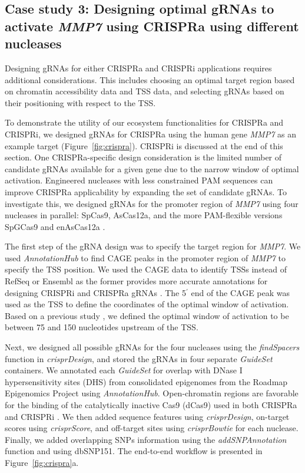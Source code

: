 \documentclass[pdftex,english,10pt]{article}
\begin{document}
\subsection*{Case study 3: Designing optimal gRNAs to activate \textit{MMP7} using CRISPRa using different nucleases}

Designing gRNAs for either CRISPRa and CRISPRi applications requires additional considerations. This includes choosing an optimal target region based on chromatin accessibility data and TSS data, and selecting gRNAs based on their positioning with respect to the TSS. 

To demonstrate the utility of our ecosystem functionalities for CRISPRa and CRISPRi, we designed gRNAs for CRISPRa using the human gene \textit{MMP7} as an example target (Figure~\ref{fig:crispra}). CRISPRi is discussed at the end of this section. One CRISPRa-specific design consideration is the limited number of candidate gRNAs available for a given gene due to the narrow window of optimal activation. 
Engineered nucleases with less constrained PAM sequences can improve CRISPRa applicability by expanding the set of candidate gRNAs. 
To investigate this, we designed gRNAs for the promoter region of \textit{MMP7} using four nucleases in parallel: SpCas9, AsCas12a, and the more PAM-flexible versions SpGCas9 \citep{spg} and enAsCas12a \citep{enpamgb}. 

The first step of the gRNA design was to specify the target region for \textit{MMP7}. 
We used \textit{AnnotationHub} to find CAGE peaks in the promoter region of \textit{MMP7} to specify the TSS position. We used the CAGE data to identify TSSs instead of RefSeq or Ensembl as the former provides more accurate annotations for designing CRISPRi and CRISPRa gRNAs \citep{radzisheuskaya2016optimizing}.
The 5$^\prime$ end of the CAGE peak was used as the TSS to define the coordinates of the optimal window of activation. 
Based on a previous study \citep{sanson2018optimized}, we defined the optimal window of activation to be between 75 and 150 nucleotides upstream of the TSS. 

Next, we designed all possible gRNAs for the four nucleases using the \textit{findSpacers} function in \textit{crisprDesign}, and stored the gRNAs in four separate \textit{GuideSet} containers. We annotated each \textit{GuideSet} for overlap with DNase I hypersensitivity sites (DHS) from consolidated epigenomes from the Roadmap Epigenomics Project \citep{kundaje2015integrative} using \textit{AnnotationHub}. Open-chromatin regions are favorable for the binding of the catalytically inactive Cas9 (dCas9) used in both CRISPRa and CRISPRi \citep{kuscu2014genome,wu2014genome}. We then added sequence features using \textit{crisprDesign}, on-target scores using \textit{crisprScore}, and off-target sites using \textit{crisprBowtie} for each nuclease. Finally, we added overlapping SNPs information using the \textit{addSNPAnnotation} function and using dbSNP151. The end-to-end workflow is presented in Figure~\ref{fig:crispra}a.
\end{document}
